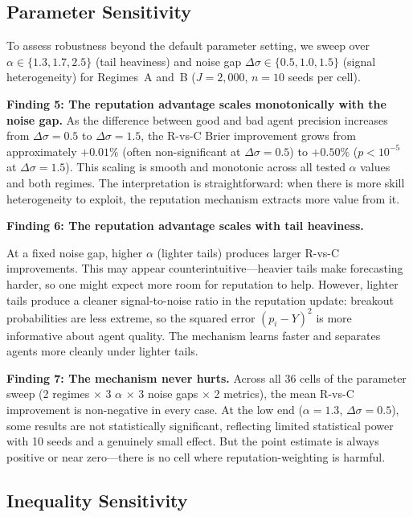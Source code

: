 \documentclass[conference]{IEEEtran}
\begin{document}
\subsection{Parameter Sensitivity}
\label{sec:results-sweep}

To assess robustness beyond the default parameter setting, we sweep over $\alpha \in \{1.3, 1.7, 2.5\}$ (tail heaviness) and noise gap $\Delta\sigma \in \{0.5, 1.0, 1.5\}$ (signal heterogeneity) for Regimes~A and~B ($J = 2{,}000$, $n = 10$ seeds per cell).

\smallskip\noindent\textbf{Finding 5: The reputation advantage scales monotonically with the noise gap.} As the difference between good and bad agent precision increases from $\Delta\sigma = 0.5$ to $\Delta\sigma = 1.5$, the R-vs-C Brier improvement grows from approximately $+0.01\%$ (often non-significant at $\Delta\sigma = 0.5$) to $+0.50\%$ ($p < 10^{-5}$ at $\Delta\sigma = 1.5$). This scaling is smooth and monotonic across all tested $\alpha$ values and both regimes. The interpretation is straightforward: when there is more skill heterogeneity to exploit, the reputation mechanism extracts more value from it.

\smallskip\noindent\textbf{Finding 6: The reputation advantage scales with tail heaviness.} { At a fixed noise gap, higher $\alpha$ (lighter tails) produces larger R-vs-C improvements. This may appear counterintuitive---heavier tails make forecasting harder, so one might expect more room for reputation to help. However, lighter tails produce a cleaner signal-to-noise ratio in the reputation update: breakout probabilities are less extreme, so the squared error $(p_i - Y)^2$ is more informative about agent quality. The mechanism learns faster and separates agents more cleanly under lighter tails.\par}

\smallskip\noindent\textbf{Finding 7: The mechanism never hurts.} Across all 36 cells of the parameter sweep (2 regimes $\times$ 3 $\alpha$ $\times$ 3 noise gaps $\times$ 2 metrics), the mean R-vs-C improvement is non-negative in every case. At the low end ($\alpha = 1.3$, $\Delta\sigma = 0.5$), some results are not statistically significant, reflecting limited statistical power with 10 seeds and a genuinely small effect. But the point estimate is always positive or near zero---there is no cell where reputation-weighting is harmful.

\subsection{Inequality Sensitivity}
\label{sec:results-inequality}
\end{document}

